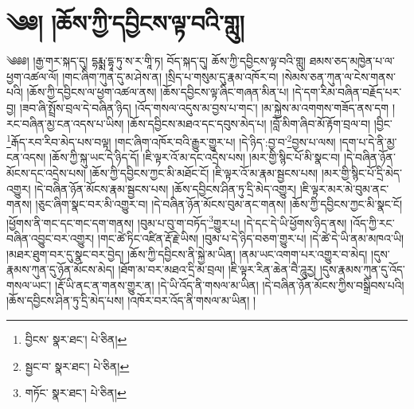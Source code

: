 \setcounter{footnote}{0} 
\chapter{༄༅། །ཆོས་ཀྱི་དབྱིངས་ལྟ་བའི་གླུ།}༄༅༅། །རྒྱ་གར་སྐད་དུ། དྷརྨྨ་དྷཱ་ཏུ་ས་ར་གཱི་ཏ། བོད་སྐད་དུ། ཆོས་ཀྱི་དབྱིངས་ལྟ་བའི་གླུ། ཐམས་ཅད་མཁྱེན་པ་ལ་ཕྱག་འཚལ་ལོ། །གང་ཞིག་ཀུན་དུ་མ་ཤེས་ན། །སྲིད་པ་གསུམ་དུ་རྣམ་འཁོར་བ། །སེམས་ཅན་ཀུན་ལ་ངེས་གནས་པའི། །ཆོས་ཀྱི་དབྱིངས་ལ་ཕྱག་འཚལ་ནས། །ཆོས་དབྱིངས་ལྟ་ཞིང་གཞན་མིན་པ། །དེ་དག་རིམ་བཞིན་བརྗོད་པར་བྱ། །ཟབ་ཞི་སྤྲོས་བྲལ་དེ་བཞིན་ཉིད། །འོད་གསལ་འདུས་མ་བྱས་པ་གང་། །མ་སྐྱེས་མ་འགགས་གཟོད་ནས་དག །རང་བཞིན་མྱ་ངན་འདས་པ་ཡིས། །ཆོས་དབྱིངས་མཐའ་དང་དབུས་མེད་པ། །བློ་མིག་ཞིབ་མོ་རྟོག་བྲལ་བ། །བྱིང་\footnote{བྱིངས་  སྣར་ཐང་།  པེ་ཅིན། }རྒོད་རབ་རིབ་མེད་པས་བལྟ། །གང་ཞིག་འཁོར་བའི་རྒྱུར་གྱུར་པ། །དེ་ཉིད་:བྱ་བ་\footnote{སྦྱང་བ་  སྣར་ཐང་།  པེ་ཅིན། }བྱས་པ་ལས། །དག་པ་དེ་ནི་མྱ་ངན་འདས། །ཆོས་ཀྱི་སྐུ་ཡང་དེ་ཉིད་དོ། །ཇི་ལྟར་འོ་མ་དང་འདྲེས་པས། །མར་གྱི་སྙིང་པོ་མི་སྣང་བ། །དེ་བཞིན་ཉོན་མོངས་དང་འདྲེས་པས། །ཆོས་ཀྱི་དབྱིངས་ཀྱང་མི་མཐོང་ངོ། །ཇི་ལྟར་འོ་མ་རྣམ་སྦྱངས་པས། །མར་གྱི་སྙིང་པོ་དྲི་མེད་འགྱུར། །དེ་བཞིན་ཉོན་མོངས་རྣམ་སྦྱངས་པས། །ཆོས་དབྱིངས་ཤིན་ཏུ་དྲི་མེད་འགྱུར། །ཇི་ལྟར་མར་མེ་བུམ་ནང་གནས། །ཅུང་ཞིག་སྣང་བར་མི་འགྱུར་བ། །དེ་བཞིན་ཉོན་མོངས་བུམ་ནང་གནས། །ཆོས་ཀྱི་དབྱིངས་ཀྱང་མི་སྣང་ངོ། །ཕྱོགས་ནི་གང་དང་གང་དག་གནས། །བུམ་པ་བུ་ག་བཏོད་\footnote{གཏོང་  སྣར་ཐང་།  པེ་ཅིན། }གྱུར་པ། །དེ་དང་དེ་ཡི་ཕྱོགས་ཉིད་ནས། །འོད་ཀྱི་རང་བཞིན་འབྱུང་བར་འགྱུར། །གང་ཚེ་ཏིང་འཛིན་རྡོ་རྗེ་ཡིས། །བུམ་པ་དེ་ཉིད་བཅག་གྱུར་པ། །དེ་ཚེ་དེ་ཡི་ནམ་མཁའ་ཡི། །མཐར་ཐུག་བར་དུ་སྣང་བར་བྱེད། །ཆོས་ཀྱི་དབྱིངས་ནི་སྐྱེ་མ་ཡིན། །ནམ་ཡང་འགག་པར་འགྱུར་བ་མེད། །དུས་རྣམས་ཀུན་དུ་ཉོན་མོངས་མེད། །ཐོག་མ་བར་མཐའ་དྲི་མ་བྲལ། །ཇི་ལྟར་རིན་ཆེན་བཻ་ཌཱུརྱ། །དུས་རྣམས་ཀུན་དུ་འོད་གསལ་ཡང་། །རྡོ་ཡི་ནང་ན་གནས་གྱུར་ན། །དེ་ཡི་འོད་ནི་གསལ་མ་ཡིན། །དེ་བཞིན་ཉོན་མོངས་ཀྱིས་བསྒྲིབས་པའི། །ཆོས་དབྱིངས་ཤིན་ཏུ་དྲི་མེད་པས། །འཁོར་བར་འོད་ནི་གསལ་མ་ཡིན། །
